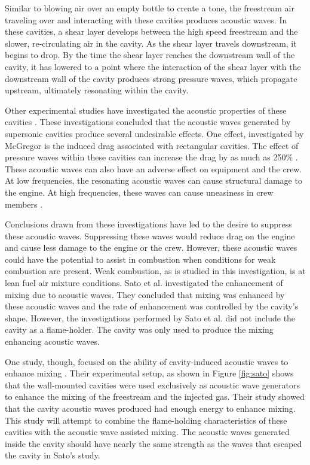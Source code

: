Similar to blowing air over an empty bottle to create a tone, the freestream air traveling over and interacting with these cavities produces acoustic waves. In these cavities, a shear layer develops between the high speed freestream and the slower, re-circulating air in the cavity. As the shear layer travels downstream, it begins to drop. By the time the shear layer reaches the downstream wall of the cavity, it has lowered to a point where the interaction of the shear layer with the downstream wall of the cavity produces strong pressure waves, which propagate upstream, ultimately resonating within the cavity. 

Other experimental studies have investigated the acoustic properties of these cavities \cite{unalmis2004cavity,heller1996letter,williams2007supersonic, mcgregor1970drag,luo2011drag}. These investigations concluded that the acoustic waves generated by supersonic cavities produce several undesirable effects. One effect, investigated by McGregor is the induced drag associated with rectangular cavities. The effect of pressure waves within these cavities can increase the drag by as much as 250\% \cite{mcgregor1970drag}. These acoustic waves can also have an adverse effect on equipment and the crew. At low frequencies, the resonating acoustic waves can cause structural damage to the engine. At high frequencies, these waves can cause uneasiness in crew members \cite{mcgregor1970drag}.

Conclusions drawn from these investigations have led to the desire to suppress these acoustic waves. Suppressing these waves would reduce drag on the engine and cause less damage to the engine or the crew. However, these acoustic waves could have the potential to assist in combustion when conditions for weak combustion are present. Weak combustion, as is studied in this investigation, is at lean fuel air mixture conditions. Sato et al.\cite{sato1999advanced} investigated the enhancement of mixing due to acoustic waves. They concluded that mixing was enhanced by these acoustic waves and the rate of enhancement was controlled by the cavity's shape. However, the investigations performed by Sato et al. did not include the cavity as a flame-holder. The cavity was only used to produce the mixing enhancing acoustic waves. 

One study, though, focused on the ability of cavity-induced acoustic waves to enhance mixing \cite{sato1990advanced}. Their experimental setup, as shown in Figure \ref{fig:sato} shows that the wall-mounted cavities were used exclusively as acoustic wave generators to enhance the mixing of the freestream and the injected gas. Their study showed that the cavity acoustic waves produced had enough energy to enhance mixing. This study will attempt to combine the flame-holding characteristics of these cavities with the acoustic wave assisted mixing. The acoustic waves generated inside the cavity should have nearly the same strength as the waves that escaped the cavity in Sato's study. 


